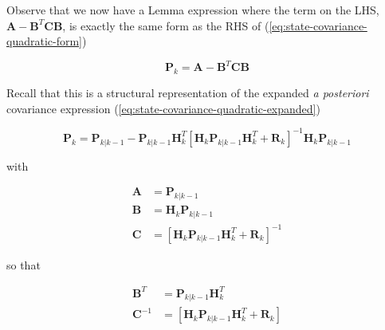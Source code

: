 Observe that we now have a Lemma expression where the term on the LHS,
$\mathbf{A} - \mathbf{B}^T \mathbf{C} \mathbf{B}$,
is exactly the same form as the RHS of (\ref{eq:state-covariance-quadratic-form})

\begin{equation*}
    \mathbf{P}_k = \mathbf{A} - \mathbf{B}^T \mathbf{C} \mathbf{B}
\end{equation*}

Recall that this is a structural representation of the expanded \textit{a posteriori}
covariance expression (\ref{eq:state-covariance-quadratic-expanded})

\begin{equation*}
    \mathbf{P}_k = \mathbf{P}_{k|k-1} - \mathbf{P}_{k|k-1} \mathbf{H}_k^T \left[ \mathbf{H}_k \mathbf{P}_{k|k-1} \mathbf{H}_k^T + \mathbf{R}_k \right]^{-1} \mathbf{H}_k \mathbf{P}_{k|k-1}
\end{equation*}

with

\begin{equation*}
    \begin{aligned}
        \mathbf{A} &= \mathbf{P}_{k|k-1} \\
        \mathbf{B} &= \mathbf{H}_k \mathbf{P}_{k|k-1} \\
        \mathbf{C} &= \left[ \mathbf{H}_k \mathbf{P}_{k|k-1} \mathbf{H}_k^T + \mathbf{R}_k \right]^{-1}
    \end{aligned}
\end{equation*}

so that

\begin{equation*}
    \begin{aligned}
        \mathbf{B}^T & = \mathbf{P}_{k|k-1} \mathbf{H}_k^T \\
        \mathbf{C}^{-1} &= \left[ \mathbf{H}_k \mathbf{P}_{k|k-1} \mathbf{H}_k^T + \mathbf{R}_k \right]
    \end{aligned}
\end{equation*}

